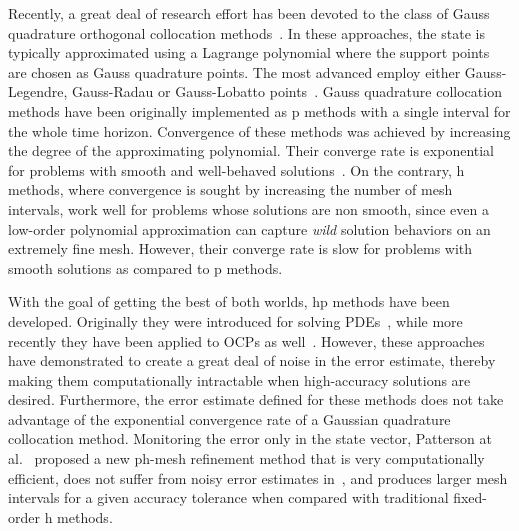 Recently, a great deal of research effort has been devoted to the class of Gauss quadrature orthogonal collocation methods~\cite{Elnager:TAC:1995,Fahroo:JGCD:2002,Garg:Automatica:2010,Darby:JSR:2011,Darby:OCAM:2011}. In these approaches, the state is typically approximated using a Lagrange polynomial where the support points are chosen as Gauss quadrature points. The most advanced employ either Gauss-Legendre, Gauss-Radau or Gauss-Lobatto points~\cite{Biegler:book:2010}. Gauss quadrature collocation methods have been originally implemented as p methods with a single interval for the whole time horizon. Convergence of these methods was achieved by increasing the degree of the approximating polynomial. Their converge rate is exponential for problems with smooth and well-behaved solutions~\cite{Canuto:book:1988,Fornberg:book:1996}. On the contrary, h methods, where convergence is sought by increasing the number of mesh intervals, work well for problems whose solutions are non smooth, since even a low-order polynomial approximation can capture \emph{wild} solution behaviors on an extremely fine mesh. However, their converge rate is slow for problems with smooth solutions as compared to p methods.

With the goal of getting the best of both worlds, hp methods have been developed. Originally they were introduced for solving PDEs~\cite{Babuska:CMAME:1990}, while more recently they have been applied to OCPs as well~\cite{Darby:OCAM:2011,Darby:JSR:2011}. However, these approaches have demonstrated to create a great deal of noise in the error estimate, thereby making them computationally intractable when high-accuracy solutions are desired. Furthermore, the error estimate defined for these methods does not take advantage of the exponential convergence rate of a Gaussian quadrature collocation method.
Monitoring the error only in the state vector, Patterson at al.~\cite{Patterson:OCAM:2015} proposed a new ph-mesh refinement method that is very computationally efficient, does not suffer from noisy error estimates in~\cite{Darby:JSR:2011}, and produces larger mesh intervals for a given accuracy tolerance when compared with traditional fixed-order h methods.

